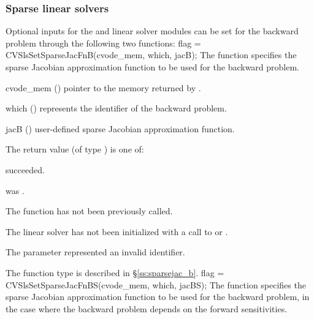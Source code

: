 \subsubsection{Sparse linear solvers}
Optional inputs for the {\cvklu} and {\cvsuperlumt} linear solver
modules can be set for the backward problem through the following two
functions: 
{
  flag = CVSlsSetSparseJacFnB(cvode\_mem, which, jacB);
}
{
  The function  specifies the sparse Jacobian
  approximation function to be used for the backward problem.
}
{
  \begin{args}
  \item[cvode\_mem] ()
    pointer to the {\cvodes} memory returned by .
  \item[which] ()
    represents the identifier of the backward problem.
  \item[jacB] ()
    user-defined sparse Jacobian approximation function.
  \end{args}
}
{
  The return value  (of type ) is one of:
  \begin{args}
  \item[\Id{CVSLS\_SUCCESS}] 
     succeeded.
  \item[\Id{CVSLS\_MEM\_NULL}]
     was .
  \item[\Id{CVSLS\_NO\_ADJ}]
    The function  has not been previously called.
  \item[\Id{CVSLS\_LMEM\_NULL}]
    The linear solver has not been initialized with a call to 
    or .
  \item[\Id{CVSLS\_ILL\_INPUT}]
    The parameter  represented an invalid identifier.
  \end{args}
}
{
  The function type  is described in \S\ref{ss:sparsejac_b}.
}
{
  flag = CVSlsSetSparseJacFnBS(cvode\_mem, which, jacBS);
}
{
  The function  specifies the sparse Jacobian
  approximation function to be used for the backward problem, in the
  case where the backward problem depends on the forward sensitivities.
}
